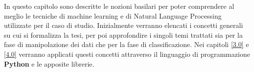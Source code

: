 In questo capitolo sono descritte le nozioni basilari per poter comprendere al meglio le tecniche di machine learning e di Natural Language Processing utilizzate per il caso di studio. Inizialmente verranno elencati i concetti generali su cui si formalizza la tesi, per poi approfondire i singoli temi trattati sia per la fase di manipolazione dei dati che per la fase di classificazione. Nei capitoli \ref{3.0} e \ref{4.0} verranno applicati questi concetti attraverso il linguaggio di programmazione \textbf{Python} e le apposite librerie.